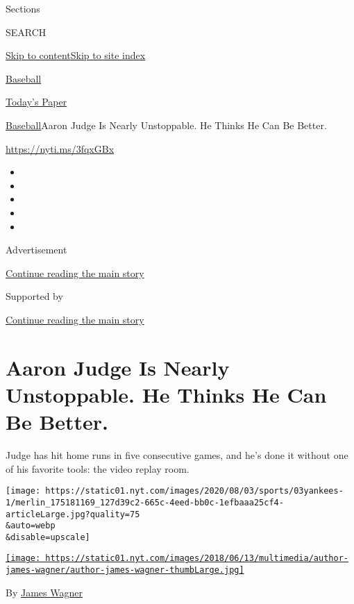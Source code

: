 Sections

SEARCH

\protect\hyperlink{site-content}{Skip to
content}\protect\hyperlink{site-index}{Skip to site index}

\href{https://www.nytimes.com/section/sports/baseball}{Baseball}

\href{https://myaccount.nytimes.com/auth/login?response_type=cookie\&client_id=vi}{}

\href{https://www.nytimes.com/section/todayspaper}{Today's Paper}

\href{/section/sports/baseball}{Baseball}\textbar{}Aaron Judge Is Nearly
Unstoppable. He Thinks He Can Be Better.

\url{https://nyti.ms/3fqxGBx}

\begin{itemize}
\item
\item
\item
\item
\item
\end{itemize}

Advertisement

\protect\hyperlink{after-top}{Continue reading the main story}

Supported by

\protect\hyperlink{after-sponsor}{Continue reading the main story}

\hypertarget{aaron-judge-is-nearly-unstoppable-he-thinks-he-can-be-better}{%
\section{Aaron Judge Is Nearly Unstoppable. He Thinks He Can Be
Better.}\label{aaron-judge-is-nearly-unstoppable-he-thinks-he-can-be-better}}

Judge has hit home runs in five consecutive games, and he's done it
without one of his favorite tools: the video replay room.

\texttt{[image: https://static01.nyt.com/images/2020/08/03/sports/03yankees-1/merlin\_175181169\_127d39c2-665c-4eed-bb0c-1efbaaa25cf4-articleLarge.jpg?quality=75\\\&auto=webp\\\&disable=upscale]}

\href{https://www.nytimes.com/by/james-wagner}{\texttt{[image: https://static01.nyt.com/images/2018/06/13/multimedia/author-james-wagner/author-james-wagner-thumbLarge.jpg]}}

By \href{https://www.nytimes.com/by/james-wagner}{James Wagner}


